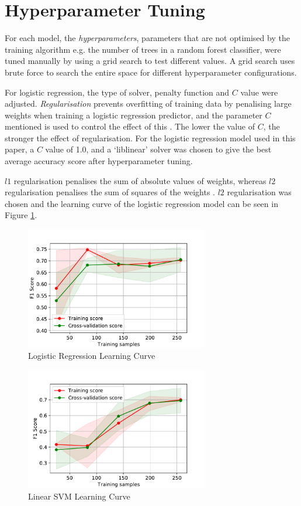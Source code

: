 \section{Hyperparameter Tuning} \label{hpt}
For each model, the \textit{hyperparameters}, parameters that are not optimised by the training algorithm e.g. the number of trees in a random forest classifier, were tuned manually by using a grid search to test different values. A grid search uses brute force to search the entire space for different hyperparameter configurations.

For logistic regression, the type of solver, penalty function and $C$ value were adjusted. \textit{Regularisation} prevents overfitting of training data by penalising large weights when training a logistic regression predictor, and the parameter $C$ mentioned is used to control the effect of this \cite{ahmadian1998regularisation}. The lower the value of $C$, the stronger the effect of regularisation. For the logistic regression model used in this paper, a $C$ value of 1.0, and a `liblinear' solver was chosen to give the best average accuracy score after hyperparameter tuning.

$l1$ regularisation penalises the sum of absolute values of weights, whereas $l2$ regularisation penalises the sum of squares of the weights \cite{ahmadian1998regularisation}. $l2$ regularisation was chosen and the learning curve of the logistic regression model can be seen in Figure \ref{fig2}.

\begin{figure}[t]
\includegraphics[width=8cm]{plots/LR TVT LC F1.pdf}
\caption{Logistic Regression Learning Curve}
\label{fig2}
\centering
\end{figure}

\begin{figure}[t]
\includegraphics[width=8cm]{plots/SVM TVT LC F1.pdf}
\caption{Linear SVM Learning Curve}
\vspace{-0.5em}
\label{fig3}
\centering
\end{figure}

